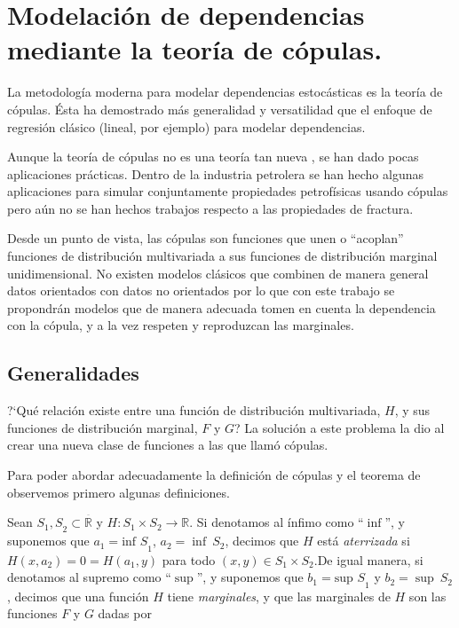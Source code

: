 \chapter{Modelaci\'on de dependencias mediante la teor\'ia de c\'opulas.}
\label{ch:copulaTheory}

La metodolog\'{i}a moderna para modelar dependencias estoc\'{a}sticas es la teor\'ia de c\'opulas. \'Esta ha demostrado m\'{a}s generalidad y versatilidad que el enfoque de regresi\'{o}n cl\'{a}sico (lineal, por ejemplo) para modelar dependencias.

Aunque la teor\'ia de c\'opulas no es una teor\'ia tan nueva \citep{sklar_fonctions_1959}, se han dado pocas aplicaciones pr\'acticas. Dentro de la industria petrolera se han hecho algunas aplicaciones para simular conjuntamente propiedades petrof\'isicas usando c\'opulas \citep{diaz-viera_stochastic_2006,diaz-viera_spatial_2012,diaz-viera_stochastic_2006-2,diaz-viera_stochastic_2005-1,diaz-viera_stochastic_2005,erdely_modeling_2011,erdely_joint_2012,erdely_trivariate_2012,erdely_nonparametric_2009,hernandez-maldonado_simulacion_2014,hernandez-maldonado_joint_2012,hernandez-maldonado_joint_2012-1,hernandez-maldonado_trivariate_2012} pero a\'un no se han hechos trabajos respecto a las propiedades de fractura.

Desde un punto de vista, las c\'opulas son funciones que unen o ``acoplan'' funciones de distribuci\'on multivariada a sus funciones de distribuci\'on marginal unidimensional. No existen modelos cl\'asicos que combinen de manera general datos orientados con datos no orientados por lo que con este trabajo se propondr\'an modelos que de manera adecuada tomen en cuenta la dependencia con la c\'opula, y a la vez respeten y reproduzcan las marginales.

\section{Generalidades}

?`Qu\'e relaci\'on existe entre una funci\'on de distribuci\'on multivariada, \(H\), y sus funciones de distribuci\'on marginal, \(F\) y \(G\)? La soluci\'on a este problema la dio \cite{sklar_fonctions_1959} al crear una nueva clase de funciones a las que llam\'o c\'opulas.

Para poder abordar adecuadamente la definici\'on de c\'opulas y el teorema de \cite{sklar_fonctions_1959} observemos primero algunas definiciones.

Sean \({S_{1},S}_{2} \subset \overset{\overline{}}{\mathbb{R}}\) y \(H:S_{1} \times S_{2}\mathbb{\rightarrow R}\). Si denotamos al \'infimo como ``\(\mathrm{\inf}\)'', y suponemos que \({a_{1} = \mathrm{\text{inf\ }}S}_{1}\), \(a_{2} = \mathrm{\inf}\ S_{2}\), decimos que \(H\) est\'a \emph{aterrizada} si \(H\left( x,a_{2} \right) = 0 = H\left( a_{1},y \right)\) para todo \(\left( x,y \right) \in S_{1} \times S_{2}\).De igual manera, si denotamos al supremo como ``\(\mathrm{\sup}\)'', y suponemos que \({b_{1} = \mathrm{\text{sup\ \ }}S}_{1}\) y \(b_{2} = \mathrm{\sup}\ S_{2}\), decimos que una funci\'on \(H\) tiene \emph{marginales}, y que las marginales de \(H\) son las funciones \(F\) y \(G\) dadas por

